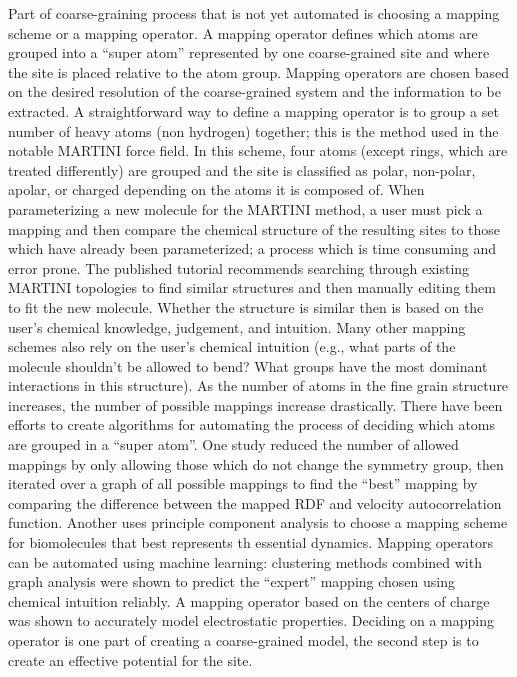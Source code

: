 Part of coarse-graining process that is not yet automated is choosing a mapping scheme or a mapping operator.
A mapping operator defines which atoms are grouped into a ``super atom'' represented by one coarse-grained site and where the site is placed relative to the atom group.
Mapping operators are chosen based on the desired resolution of the coarse-grained system and the information to be extracted.
A straightforward way to define a mapping operator is to group a set number of heavy atoms (non hydrogen) together; this is the method used in the notable MARTINI force field\cite{Marrink2007}.
In this scheme, four atoms (except rings, which are treated differently) are grouped and the site is classified as polar, non-polar, apolar, or charged depending on the atoms it is composed of.
When parameterizing a new molecule for the MARTINI method, a user must pick a mapping and then compare the chemical structure of the resulting sites to those which have already been parameterized; a process which is time consuming and error prone\cite{martini-tutorial}.
The published tutorial recommends searching through existing MARTINI topologies to find similar structures and then manually editing them to fit the new molecule.
Whether the structure is similar then is based on the user's chemical knowledge, judgement, and intuition.
Many other mapping schemes also rely on the user's chemical intuition (e.g., what parts of the molecule shouldn't be allowed to bend? What groups have the most dominant interactions in this structure)\cite{Huang2010, Knotts2007}.
As the number of atoms in the fine grain structure increases, the number of possible mappings increase drastically.
There have been efforts to create algorithms for automating the process of deciding which atoms are grouped in a ``super atom''.
One study reduced the number of allowed mappings by only allowing those which do not change the symmetry group, then iterated over a graph of all possible mappings to find the ``best'' mapping by comparing the difference between the mapped RDF and velocity autocorrelation function\cite{Chakraborty2018b}.
Another uses principle component analysis to choose a mapping scheme for biomolecules that best represents th essential dynamics\cite{Zhang2008}.
Mapping operators can be automated using machine learning: clustering methods combined with graph analysis were shown to predict the ``expert'' mapping chosen using chemical intuition reliably\cite{Li2020}. 
A mapping operator based on the centers of charge was shown to accurately model electrostatic properties\cite{Cao2015a}.
Deciding on a mapping operator is one part of creating a coarse-grained model, the second step is to create an effective potential for the site.

